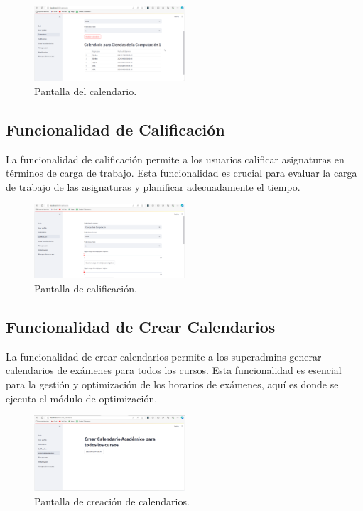 \documentclass{article}
\begin{document}
\begin{figure}[h!] \centering \includegraphics[width=0.5\textwidth]{calendario1.png} \caption{Pantalla del calendario.} \end{figure}

\subsection{Funcionalidad de Calificación}

La funcionalidad de calificación permite a los usuarios calificar asignaturas en términos de carga de trabajo. Esta funcionalidad es crucial para evaluar la carga de trabajo de las asignaturas y planificar adecuadamente el tiempo.

\begin{figure}[h!] \centering \includegraphics[width=0.5\textwidth]{calificacion.png} \caption{Pantalla de calificación.} \end{figure}

\subsection{Funcionalidad de Crear Calendarios}

La funcionalidad de crear calendarios permite a los superadmins  generar calendarios de exámenes para todos los cursos. Esta funcionalidad es esencial para la gestión y optimización de los horarios de exámenes, aquí es donde se ejecuta el módulo de optimización.

\begin{figure}[H] \centering \includegraphics[width=0.5\textwidth]{crear_calendarios.png} \caption{Pantalla de creación de calendarios.} \end{figure}
\end{document}
